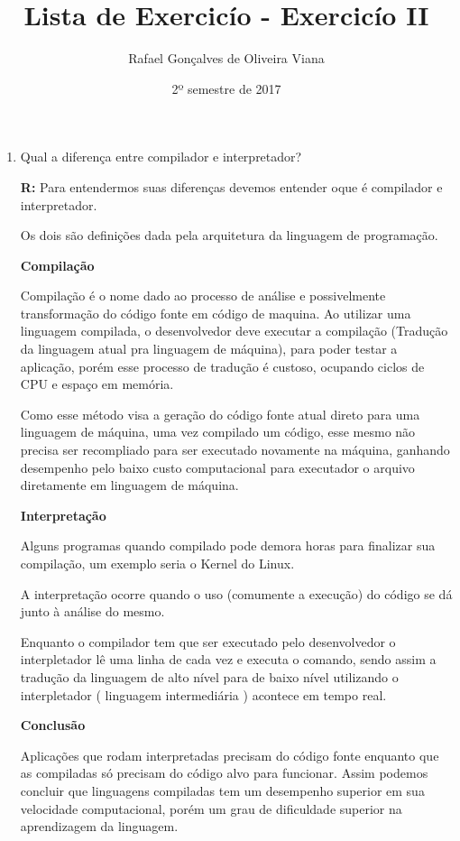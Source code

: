 \documentclass[12pt]{article}
\title{Lista de Exercicío  - Exercicío II }
\author{Rafael Gonçalves de  Oliveira Viana}
\date{2º semestre de 2017}
\begin{document}
\maketitle

\begin{enumerate}
\item
Qual a diferença entre compilador e interpretador?

\textbf{R:}	
Para entendermos suas diferenças devemos entender oque é compilador e interpretador.
 
Os dois são definições dada pela arquitetura da linguagem de programação.

\textbf{Compilação}

Compilação é o nome dado ao processo de análise e possivelmente transformação do código fonte em código de maquina. Ao utilizar uma linguagem compilada, o desenvolvedor deve executar a compilação (Tradução da linguagem atual pra linguagem de máquina), para poder testar a aplicação, porém esse processo de tradução é custoso, ocupando ciclos de CPU e espaço em memória.

Como esse método visa a geração do código fonte atual direto para uma linguagem de máquina, uma vez compilado um código, esse mesmo não precisa ser recompliado para ser executado novamente na máquina, ganhando desempenho pelo baixo custo computacional para executador o arquivo diretamente em linguagem de máquina.

\textbf{Interpretação}

Alguns programas quando compilado pode demora horas para finalizar sua compilação, um exemplo seria o Kernel do Linux. 

A interpretação ocorre quando o uso (comumente a execução) do código se dá junto à análise do mesmo.

Enquanto o compilador tem que ser executado pelo desenvolvedor o interpletador lê uma linha de cada vez e executa o comando, sendo assim a tradução da linguagem de alto nível para de baixo nível utilizando o interpletador ( linguagem intermediária ) acontece em tempo real.

\textbf{Conclusão}

 Aplicações que rodam interpretadas precisam do código fonte enquanto que as compiladas só precisam do código alvo para funcionar. Assim podemos concluir que linguagens compiladas tem um desempenho superior em sua velocidade computacional, porém um grau de dificuldade superior na aprendizagem da linguagem.

 
 
\end{enumerate}
\end{document}
